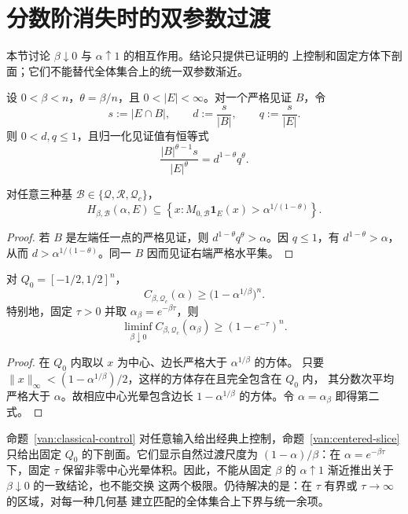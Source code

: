 \section{分数阶消失时的双参数过渡}
\label{sec:vanishing-order}

本节讨论 $\beta\downarrow0$ 与 $\alpha\uparrow1$ 的相互作用。结论只提供已证明的
上控制和固定方体下剖面；它们不能替代全体集合上的统一双参数渐近。

设 $0<\beta<n$，$\theta=\beta/n$，且 $0<|E|<\infty$。对一个严格见证 $B$，令
\[
 s:=|E\cap B|,\qquad d:=\frac{s}{|B|},\qquad q:=\frac{s}{|E|}.
\]
则 $0<d,q\leq1$，且归一化见证值有恒等式
\[
 \frac{|B|^{\theta-1}s}{|E|^\theta}=d^{1-\theta}q^\theta.
\]

\begin{proposition}[经典光晕的统一上控制]\label{van:classical-control}
对任意三种基 $\mathcal B\in\{\mathcal Q,\mathcal R,\mathcal Q_c\}$，
\[
 H_{\beta,\mathcal B}(\alpha,E)
 \subseteq
 \left\{x:M_{0,\mathcal B}\mathbf1_E(x)>\alpha^{1/(1-\theta)}\right\}.
\]
\end{proposition}

\begin{proof}
若 $B$ 是左端任一点的严格见证，则
$d^{1-\theta}q^\theta>\alpha$。因 $q\leq1$，有 $d^{1-\theta}>\alpha$，从而
$d>\alpha^{1/(1-\theta)}$。同一 $B$ 因而见证右端严格水平集。
\end{proof}

\begin{proposition}[中心方体的过渡下剖面]\label{van:centered-slice}
对 $Q_0=[-1/2,1/2]^n$，
\[
 C_{\beta,\mathcal Q_c}(\alpha)
 \geq\bigl(1-\alpha^{1/\beta}\bigr)^n.
\]
特别地，固定 $\tau>0$ 并取 $\alpha_\beta=e^{-\beta\tau}$，则
\[
 \liminf_{\beta\downarrow0}
 C_{\beta,\mathcal Q_c}(\alpha_\beta)
 \geq(1-e^{-\tau})^n.
\]
\end{proposition}

\begin{proof}
在 $Q_0$ 内取以 $x$ 为中心、边长严格大于 $\alpha^{1/\beta}$ 的方体。
只要 $\|x\|_\infty<(1-\alpha^{1/\beta})/2$，这样的方体存在且完全包含在 $Q_0$ 内，
其分数次平均严格大于 $\alpha$。故相应中心光晕包含边长
$1-\alpha^{1/\beta}$ 的方体。令 $\alpha=\alpha_\beta$ 即得第二式。
\end{proof}

\begin{remark}[已知边界与开放问题]\label{van:open-problem}
命题~\ref{van:classical-control} 对任意输入给出经典上控制，命题~\ref{van:centered-slice}
只给出固定 $Q_0$ 的下剖面。它们显示自然过渡尺度为 $(1-\alpha)/\beta$：在
$\alpha=e^{-\beta\tau}$ 下，固定 $\tau$ 保留非零中心光晕体积。因此，不能从固定
$\beta$ 的 $\alpha\uparrow1$ 渐近推出关于 $\beta\downarrow0$ 的一致结论，也不能交换
这两个极限。仍待解决的是：在 $\tau$ 有界或 $\tau\to\infty$ 的区域，对每一种几何基
建立匹配的全体集合上下界与统一余项。
\end{remark}
